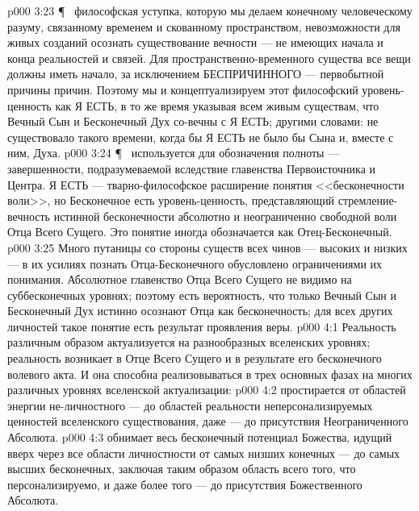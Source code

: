 \vs p000 3:23 \P\  философская уступка, которую мы делаем конечному человеческому разуму, связанному временем и скованному пространством, невозможности для живых созданий осознать существование вечности --- не имеющих начала и конца реальностей и связей. Для пространственно\hyp{}временного существа все вещи должны иметь начало, за исключением БЕСПРИЧИННОГО --- первобытной причины причин. Поэтому мы и концептуализируем этот философский уровень\hyp{}ценность как Я ЕСТЬ, в то же время указывая всем живым существам, что Вечный Сын и Бесконечный Дух со\hyp{}вечны с Я ЕСТЬ; другими словами: не существовало такого времени, когда бы Я ЕСТЬ не было бы  Сына и, вместе с ним, Духа.
\vs p000 3:24 \P\  используется для обозначения полноты --- завершенности, подразумеваемой вследствие главенства Первоисточника и Центра.  Я ЕСТЬ --- тварно\hyp{}философское расширение понятия <<бесконечности воли>>, но Бесконечное есть  уровень\hyp{}ценность, представляющий стремление\hyp{}вечность истинной бесконечности абсолютно и неограниченно свободной воли Отца Всего Сущего. Это понятие иногда обозначается как Отец\hyp{}Бесконечный.
\vs p000 3:25 Много путаницы со стороны существ всех чинов --- высоких и низких --- в их усилиях познать Отца\hyp{}Бесконечного обусловлено ограничениями их понимания. Абсолютное главенство Отца Всего Сущего не видимо на суббесконечных уровнях; поэтому есть вероятность, что только Вечный Сын и Бесконечный Дух истинно осознают Отца как бесконечность; для всех других личностей такое понятие есть результат проявления веры.
\vs p000 4:1 Реальность различным образом актуализуется на разнообразных вселенских уровнях; реальность возникает в Отце Всего Сущего и в результате его бесконечного волевого акта. И она способна реализовываться в трех основных фазах на многих различных уровнях вселенской актуализации:
\vs p000 4:2 \bibnobreakspace {} простирается от областей энергии не\hyp{}личностного --- до областей реальности неперсонализируемых ценностей вселенского существования, даже --- до присутствия Неограниченного Абсолюта.
\vs p000 4:3 \bibnobreakspace {} обнимает весь бесконечный потенциал Божества, идущий вверх через все области личностности от самых низших конечных --- до самых высших бесконечных, заключая таким образом область всего того, что персонализируемо, и даже более того --- до присутствия Божественного Абсолюта.
